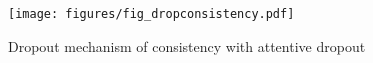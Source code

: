 \begin{figure}[t]
	\centering
    \texttt{[image: figures/fig\_dropconsistency.pdf]}
    \vspace{-1.8em}
    \caption{Dropout mechanism of consistency with attentive dropout}
    \label{fig:dropconsistency}
\end{figure}